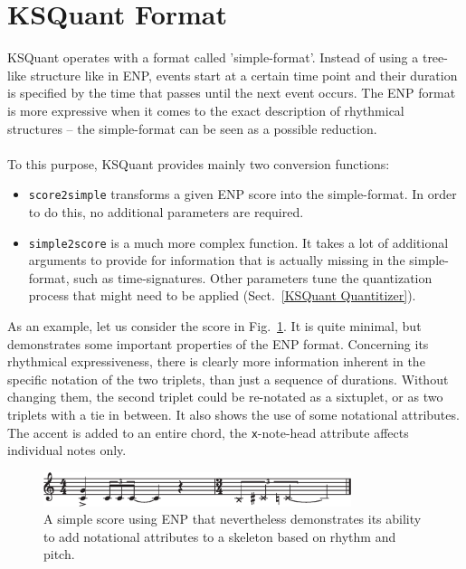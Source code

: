 \documentclass[runningheads,a4paper]{llncs}
\begin{document}
\section{KSQuant  Format}\label{KSQuant format}
KSQuant operates with a format called 'simple-format'. Instead of
using a tree-like structure like in ENP, events start at a certain
time point and their duration is specified by the time that passes
until the next event occurs. The ENP format is more expressive when it
comes to the exact description of rhythmical structures -- the
simple-format can be seen as a possible reduction.
\\
\\
To this purpose, KSQuant provides mainly two conversion functions:
\begin{itemize}
\item \texttt{score2simple} transforms a given ENP score into the
  simple-format.  In order to do this, no additional parameters are
  required.
\item \texttt{simple2score} is a much more complex function. It takes
  a lot of additional arguments to provide for information that is
  actually missing in the simple-format, such as
  time-signatures. Other parameters tune the quantization process that
  might need to be applied (Sect.~\ref{KSQuant Quantitizer}).
\end{itemize}

As an example, let us consider the score in Fig.~\ref{fig:enp-ex1}. It
is quite minimal, but demonstrates some important properties of the
ENP format. Concerning its rhythmical expressiveness, there is clearly
more information inherent in the specific notation of the two
triplets, than just a sequence of durations. Without changing them,
the second triplet could be re-notated as a sixtuplet, or as two
triplets with a tie in between.  It also shows the use of some
notational attributes. The accent is added to an entire chord, the
\texttt{x}-note-head attribute affects individual notes only.

\begin{figure}
  \centering
  \includegraphics[width=9cm]{enp-ex1}
  \caption{A simple score using ENP that nevertheless demonstrates its
    ability to add notational attributes to a skeleton based on rhythm
    and pitch.}
  \label{fig:enp-ex1}
\end{figure}
\end{document}

